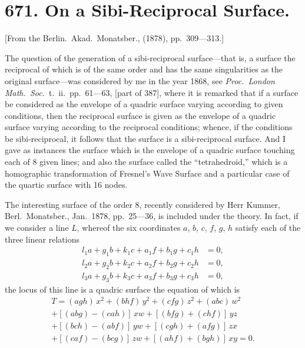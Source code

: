 \documentclass[11pt,a4paper]{book}
\begin{document}
\newpage

\section*{671. On a Sibi-Reciprocal Surface.}

[From the Berlin.\ Akad.\ Monatsber., (1878), pp.\ 309---313.]

The question of the generation of a sibi-reciprocal surface---that is, a surface the reciprocal of which is of the same order and has the same singularities as the original surface---was considered by me in the year 1868, see \textit{Proc.\ London Math.\ Soc.}\ t.\ ii.\ pp.\ 61---63, [part of 387], where it is remarked that if a surface be considered as the envelope of a quadric surface varying according to given conditions, then the reciprocal surface is given as the envelope of a quadric surface varying according to the reciprocal conditions; whence, if the conditions be sibi-reciprocal, it follows that the surface is a sibi-reciprocal surface. And I gave as instances the surface which is the envelope of a quadric surface touching each of 8 given lines; and also the surface called the ``tetrahedroid,'' which is a homographic transformation of Fresnel's Wave Surface and a particular case of the quartic surface with 16 nodes.

The interesting surface of the order 8, recently considered by Herr Kummer, Berl.\ Monatsber., Jan.\ 1878, pp.\ 25---36, is included under the theory. In fact, if we consider a line $L$, whereof the six coordinates $a$, $b$, $c$, $f$, $g$, $h$ satisfy each of the three linear relations
\begin{align*}
l_1 a + g_1 b + k_1 c + a_1 f + b_1 g + c_1 h &= 0,\\
l_2 a + g_2 b + k_2 c + a_2 f + b_2 g + c_2 h &= 0,\\
l_3 a + g_3 b + k_3 c + a_3 f + b_3 g + c_3 h &= 0,
\end{align*}
the locus of this line is a quadric surface the equation of which is
\begin{multline*}
T = (agh)\, x^2 + (bhf)\, y^2 + (cfg)\, z^2 + (abc)\, w^2 \\
+ [(abg) - (cah)]\, xw + [(bfg) + (chf)]\, yz \\
+ [(bch) - (abf)]\, yw + [(cgh) + (afg)]\, zx \\
+ [(caf) - (bcg)]\, zw + [(ahf) + (bgh)]\, xy = 0.
\end{multline*}
\end{document}
